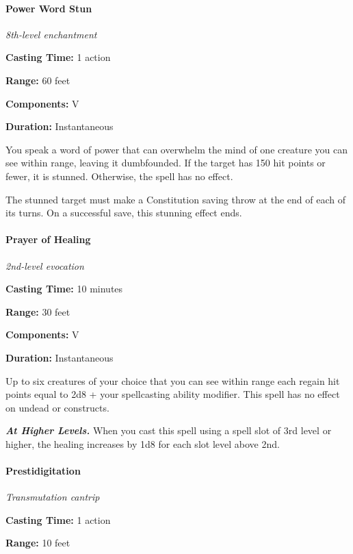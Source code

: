 \documentclass[
]{article}
\begin{document}
\hypertarget{power-word-stun}{%
\paragraph{Power Word Stun}\label{power-word-stun}}

\emph{8th-level enchantment}

\textbf{Casting Time:} 1 action

\textbf{Range:} 60 feet

\textbf{Components:} V

\textbf{Duration:} Instantaneous

You speak a word of power that can overwhelm the mind of one creature
you can see within range, leaving it dumbfounded. If the target has 150
hit points or fewer, it is stunned. Otherwise, the spell has no effect.

The stunned target must make a Constitution saving throw at the end of
each of its turns. On a successful save, this stunning effect ends.

\hypertarget{prayer-of-healing}{%
\paragraph{Prayer of Healing}\label{prayer-of-healing}}

\emph{2nd-level evocation}

\textbf{Casting Time:} 10 minutes

\textbf{Range:} 30 feet

\textbf{Components:} V

\textbf{Duration:} Instantaneous

Up to six creatures of your choice that you can see within range each
regain hit points equal to 2d8 + your spellcasting ability modifier.
This spell has no effect on undead or constructs.

\emph{\textbf{At Higher Levels.}} When you cast this spell using a spell
slot of 3rd level or higher, the healing increases by 1d8 for each slot
level above 2nd.

\hypertarget{prestidigitation}{%
\paragraph{Prestidigitation}\label{prestidigitation}}

\emph{Transmutation cantrip}

\textbf{Casting Time:} 1 action

\textbf{Range:} 10 feet
\end{document}
